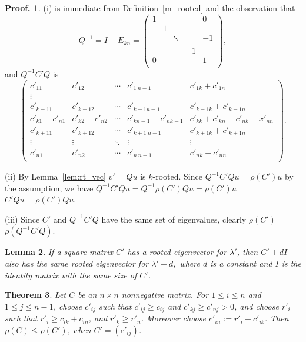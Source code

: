 \documentclass[12pt]{report}
\theoremstyle{plain}
\newtheorem{thm}{Theorem}[section]
\newtheorem{lem}[thm]{Lemma}
\theoremstyle{definition}
\newtheorem{pof}[thm]{Proof.}
\begin{document}
\begin{pof}
(i) is immediate from Definition~\ref{m_rooted} and the observation that
$$Q^{-1}=I-E_{kn}=\begin{pmatrix}
1 &  & & &  & 0 \\
 & 1 &  &      &  &  \\
 &  & \ddots & &  & -1 \\
 &  &        & &  &  \\
  &  & & & 1 &  \\
0 &  & & &  & 1 \\
\end{pmatrix},$$
and $Q^{-1}C'Q$ is
$$\begin{pmatrix}
c'_{11}     & c'_{12} & \cdots     & c'_{1\ n-1} & c'_{1k}+c'_{1n} \\
\vdots \\
c'_{k-11}     & c'_{k-1 2}           & \cdots     & c'_{k-1 n-1} & c'_{k-1k}+c'_{k-1n} \\
c'_{k1}-c'_{n1} & c'_{k2}-c'_{n2} &\cdots      &c'_{kn-1}-c'_{nk-1}& c'_{kk}+c'_{kn}-c'_{nk}-x'_{nn}\\
c'_{k+11}     & c'_{k+12}           & \cdots     & c'_{k+1\ n-1} & c'_{k+1k}+c'_{k+1n} \\
\vdots              & \vdots & \ddots              & \vdots & \vdots \\
c'_{n1}             & c'_{n2} & \cdots             & c'_{n\ n-1} & c'_{nk}+c'_{nn} \\
\end{pmatrix}.
$$



(ii)
By Lemma~\ref{lem:rt_vec} $v'=Qu$ is $k$-rooted.
Since $Q^{-1}C'Qu=\rho(C')u$ by the assumption, we have
$Q^{-1} C' Q u  = Q^{-1} \rho(C') Qu  =\rho(C')u$  \\
$C'Qu=\rho(C')Qu$.



(iii)
Since $C'$ and $Q^{-1}C'Q$ have the same set of eigenvalues, clearly $\rho(C')$ = $\rho(Q^{-1}C'Q)$.

\end{pof}


\begin{lem}\label{l_diag}
If a square matrix $C'$ has a rooted eigenvector for $\lambda'$, then $C'+dI$ also has
the same rooted eigenvector for $\lambda'+d,$ where $d$ is a constant and $I$ is the identity matrix with the same size of $C'$.
\end{lem}

\begin{thm}
Let $C$ be an $n\times n$ nonnegative matrix. For $1\leq i \leq n$ and $1\leq j\leq n-1$, choose $c'_{ij}$
such that $c'_{ij}\geq c_{ij}$ and $c'_{kj}\geq c'_{nj}>0$, and choose $r'_i$ such that $r'_i\geq c_{ik}+c_{in}$, and
$r'_k \geq r'_n$. Moreover choose $c'_{in}:=r'_i-c'_{ik}$. Then $\rho(C)\leq \rho(C')$, when $C'=(c'_{ij})$.
\end{thm}
\end{document}

